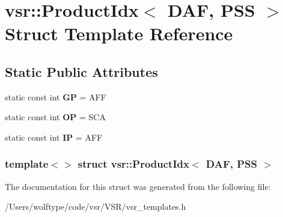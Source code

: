 \hypertarget{structvsr_1_1_product_idx_3_01_d_a_f_00_01_p_s_s_01_4}{\section{vsr\-:\-:Product\-Idx$<$ D\-A\-F, P\-S\-S $>$ Struct Template Reference}
\label{structvsr_1_1_product_idx_3_01_d_a_f_00_01_p_s_s_01_4}
}
\subsection*{Static Public Attributes}
\begin{DoxyCompactItemize}
\item 
\hypertarget{structvsr_1_1_product_idx_3_01_d_a_f_00_01_p_s_s_01_4_a9004ce618ce1d84576847beec5ab0684}{static const int {\bfseries G\-P} = A\-F\-F}\label{structvsr_1_1_product_idx_3_01_d_a_f_00_01_p_s_s_01_4_a9004ce618ce1d84576847beec5ab0684}

\item 
\hypertarget{structvsr_1_1_product_idx_3_01_d_a_f_00_01_p_s_s_01_4_ae0036251db70ce32dcf6f229c9970717}{static const int {\bfseries O\-P} = S\-C\-A}\label{structvsr_1_1_product_idx_3_01_d_a_f_00_01_p_s_s_01_4_ae0036251db70ce32dcf6f229c9970717}

\item 
\hypertarget{structvsr_1_1_product_idx_3_01_d_a_f_00_01_p_s_s_01_4_a9f825419dfea14fd2561f8b2275ca7fc}{static const int {\bfseries I\-P} = A\-F\-F}\label{structvsr_1_1_product_idx_3_01_d_a_f_00_01_p_s_s_01_4_a9f825419dfea14fd2561f8b2275ca7fc}

\end{DoxyCompactItemize}
\subsubsection*{template$<$$>$ struct vsr\-::\-Product\-Idx$<$ D\-A\-F, P\-S\-S $>$}



The documentation for this struct was generated from the following file\-:\begin{DoxyCompactItemize}
\item 
/\-Users/wolftype/code/vsr/\-V\-S\-R/vsr\-\_\-templates.\-h\end{DoxyCompactItemize}
